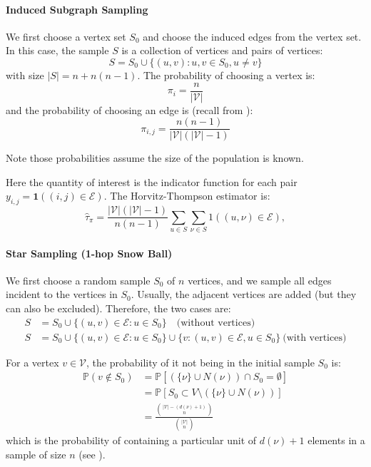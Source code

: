 \documentclass{article}
\begin{document}
\paragraph{Induced Subgraph Sampling} We first choose a vertex set $S_0$ and choose the induced edges from the vertex set. In this case, the sample $S$ is a collection of vertices and pairs of vertices:
\begin{equation*}
    S = S_0 \cup \{(u,v): u,v\in S_0, u\neq v\}
\end{equation*}
with size $|S|=n+n(n-1)$. The probability of choosing a vertex is:
\begin{equation*}
    \pi_i = \frac{n}{|\mathcal{V}|}
\end{equation*}
and the probability of choosing an edge is (recall from ):
\begin{equation*}
    \pi_{i,j} = \frac{n(n-1)}{|\mathcal{V}|(|\mathcal{V}|-1)}
\end{equation*}

Note those probabilities assume the size of the population is known.  


\begin{example}
    Here the quantity of interest is the indicator function for each pair $y_{i,j}=\mathbf{1}((i,j)\in \mathcal{E})$. The Horvitz-Thompson estimator is:
    \begin{equation*}
        \hat{\tau}_{\pi}=\frac{|\mathcal{V}|(|\mathcal{V}|-1)}{n(n-1)}\sum_{u\in S}\sum_{\nu\in S}1((u,\nu)\in\mathcal{E}),
    \end{equation*}
\end{example}

\paragraph{Star Sampling (1-hop Snow Ball)} We first choose a random sample $S_0$ of $n$ vertices, and we sample all edges incident to the vertices in $S_0$. Usually, the adjacent vertices are added (but they can also be excluded). Therefore, the two cases are:
\begin{align*}
    S &= S_0\cup \{(u,v)\in \mathcal{E}: u\in S_0\}\quad \text{(without vertices)}\\
    S &= S_0\cup \{(u,v)\in \mathcal{E}: u\in S_0\} \cup \{v: (u,v)\in \mathcal{E}, u\in S_0\} \ \text{(with vertices)}
\end{align*}
\begin{example}
    For a vertex $v\in \mathcal{V}$, the probability of it not being in the initial sample $S_0$ is:
    \begin{align*}
        \mathbb{P}(v\notin S_0) &= \mathbb{P}[\left(\{\nu\}\cup N(\nu)\right)\cap S_{0}=\emptyset]\\
        &= \mathbb{P}[S_{0}\subset V\setminus(\{\nu\}\cup N(\nu))]\\
        &= \frac{\binom{|\mathcal{V}|-(d(\nu)+1)}{n}}{\binom{|\mathcal{V}|}{n}}
    \end{align*}
    which is the probability of containing a particular unit of $d(\nu)+1$ elements in a sample of size $n$ (see ).
\end{example}
\end{document}
